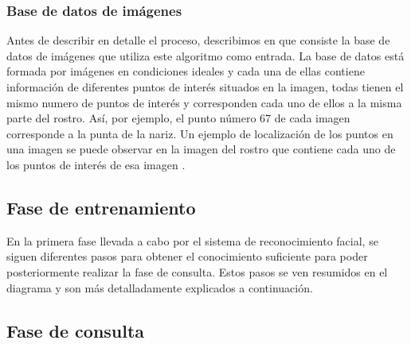 \subsubsection{Base de datos de imágenes}

Antes de describir en detalle el proceso, describimos en que consiste la base de datos de imágenes que utiliza este algoritmo como entrada. La base de datos est\'a formada por imágenes en condiciones ideales y cada una de ellas contiene información de diferentes puntos de interés situados en la imagen, todas tienen el mismo numero de puntos de interés y corresponden cada uno de ellos a la misma parte del rostro. As\'i, por ejemplo, el punto n\'umero 67 de cada imagen corresponde a la punta de la nariz. Un ejemplo de localización de los puntos en una imagen se puede observar en la imagen del rostro que contiene cada uno de los puntos de interés de esa imagen .

\subsection{Fase de entrenamiento}

En la primera fase llevada a cabo por el sistema de reconocimiento facial, se siguen diferentes pasos para obtener el conocimiento suficiente para poder posteriormente realizar la fase de consulta. Estos pasos se ven resumidos en el diagrama  y son m\'as detalladamente explicados a continuación. 








\subsection{Fase de consulta}









